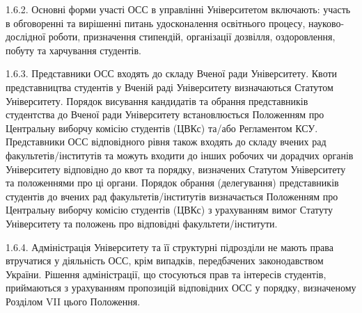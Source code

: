     1.6.2. Основні форми участі ОСС в управлінні Університетом включають: участь в обговоренні та вирішенні питань удосконалення освітнього процесу, науково-дослідної роботи, призначення стипендій, організації дозвілля, оздоровлення, побуту та харчування студентів.

    1.6.3. Представники ОСС входять до складу Вченої ради Університету. Квоти представництва студентів у Вченій раді Університету визначаються Статутом Університету. Порядок висування кандидатів та обрання представників студентства до Вченої ради Університету встановлюється Положенням про Центральну виборчу комісію студентів (ЦВКс) та/або Регламентом КСУ. Представники ОСС відповідного рівня також входять до складу вчених рад факультетів/інститутів та можуть входити до інших робочих чи дорадчих органів Університету відповідно до квот та порядку, визначених Статутом Університету та положеннями про ці органи. Порядок обрання (делегування) представників студентів до вчених рад факультетів/інститутів визначається Положенням про Центральну виборчу комісію студентів (ЦВКс) з урахуванням вимог Статуту Університету та положень про відповідні факультети/інститути.

    1.6.4. Адміністрація Університету та її структурні підрозділи не мають права втручатися у діяльність ОСС, крім випадків, передбачених законодавством України. Рішення адміністрації, що стосуються прав та інтересів студентів, приймаються з урахуванням пропозицій відповідних ОСС у порядку, визначеному Розділом VII цього Положення.